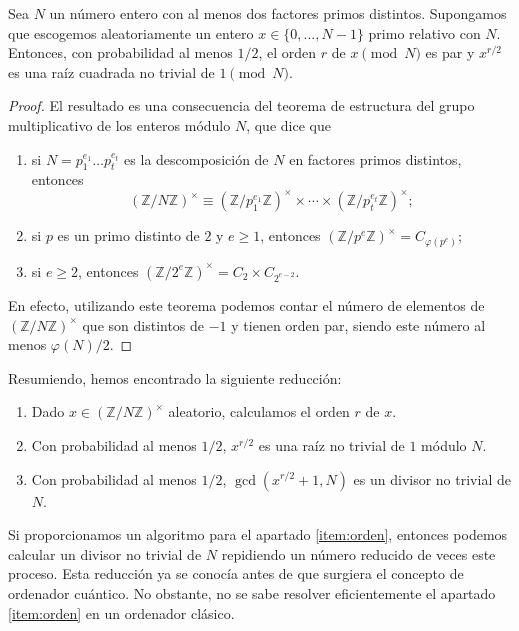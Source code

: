 \documentclass{article}
\begin{document}
\begin{lemma} \label{lem:reduccion-orden}
  Sea $N$ un número entero con al menos dos factores primos distintos. Supongamos que escogemos aleatoriamente un entero $x \in \{0, \ldots, N-1\}$ primo relativo con $N$. Entonces, con probabilidad al menos $1/2$, el orden $r$ de $x \pmod{N}$ es par y $x^{r/2}$ es una raíz cuadrada no trivial de $1 \pmod{N}$.
\end{lemma}
\begin{proof}
  El resultado es una consecuencia del teorema de estructura del grupo multiplicativo de los enteros módulo $N$, que dice que  
  \begin{enumerate}
      \item  si $N = p_1^{e_1} \ldots p_t^{e_t}$ es la descomposición de $N$ en factores primos distintos, entonces  \[\left(\mathbb{Z}/ N \mathbb{Z}\right)^{\times} \equiv \left(\mathbb{Z}/ p_1^{e_1} \mathbb{Z}\right)^{\times} \times \cdots \times \left(\mathbb{Z}/ p_t^{e_t} \mathbb{Z}\right)^{\times};\]
      \item si $p$ es un primo distinto de $2$ y $e \ge 1$, entonces $\left(\mathbb{Z}/ p^{e} \mathbb{Z}\right)^{\times} = C_{\varphi(p^e)}$;
      \item si $e \ge 2$, entonces $\left(\mathbb{Z}/ 2^{e} \mathbb{Z}\right)^{\times} = C_2 \times C_{2^{e-2}}$.
  \end{enumerate}
  En efecto, utilizando este teorema podemos contar el número de elementos de $\left(\mathbb{Z}/ N \mathbb{Z}\right)^{\times}$ que son distintos de $-1$ y tienen orden par, siendo este número al menos $\varphi(N)/2$. 
\end{proof}

Resumiendo, hemos encontrado la siguiente reducción:

\begin{enumerate}
    \item \label{item:orden} Dado $x \in \left(\mathbb{Z} / N \mathbb{Z}\right)^\times$ aleatorio, calculamos el orden $r$ de $x$.
    \item Con probabilidad al menos $1/2$, $x^{r/2}$ es una raíz no trivial de $1$ módulo $N$.
    \item Con probabilidad al menos $1/2$, $\gcd(x^{r/2}+1, N)$ es un divisor no trivial de $N$.
\end{enumerate}
Si proporcionamos un algoritmo para el apartado \ref{item:orden}, entonces podemos calcular un divisor no trivial de $N$ repidiendo un número reducido de veces este proceso. Esta reducción ya se conocía antes de que surgiera el concepto de ordenador cuántico. No obstante, no se sabe resolver eficientemente el apartado \ref{item:orden} en un ordenador clásico. 
\end{document}
